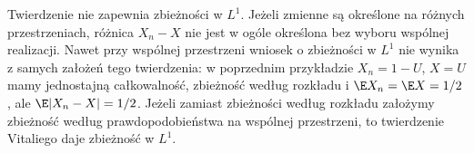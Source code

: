 \begin{uwaga}
Twierdzenie nie zapewnia zbieżności w $L^1$.
Jeżeli zmienne są określone na różnych przestrzeniach,
różnica $X_n-X$ nie jest w ogóle określona bez wyboru
wspólnej realizacji. Nawet przy wspólnej przestrzeni
wniosek o zbieżności w $L^1$ nie wynika z samych założeń
tego twierdzenia: w poprzednim przykładzie $X_n=1-U$,
$X=U$ mamy jednostajną całkowalność, zbieżność według
rozkładu i $\E X_n=\E X=1/2$, ale
$\E|X_n-X|=1/2$.
Jeżeli zamiast zbieżności według rozkładu założymy
zbieżność według prawdopodobieństwa na wspólnej
przestrzeni, to twierdzenie Vitaliego daje zbieżność
w $L^1$.
\end{uwaga}


